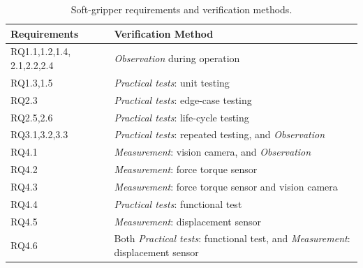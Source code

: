 \documentclass[lettersize,journal]{IEEEtran}
\begin{document}
\begin{table}%
	\centering
	\begin{tabular}{|p{16mm}|p{65mm}|}
		\hline
		\textbf{Requirements} & \textbf{Verification Method} \\ 
		\hline
		RQ1.1,1.2,1.4, 2.1,2.2,2.4 & \emph{Observation} during operation\\%
		\hline
		RQ1.3,1.5 & \emph{Practical tests}: unit testing  \\
		\hline
		RQ2.3 & \emph{Practical tests}: edge-case testing \\
		\hline
		RQ2.5,2.6 & \emph{Practical tests}: life-cycle testing \\
		\hline
		RQ3.1,3.2,3.3 & \emph{Practical tests}: repeated testing, and \emph{Observation} \\
		\hline
		RQ4.1 & \emph{Measurement}: vision camera, and \emph{Observation}  \\ 
		\hline
		RQ4.2 & \emph{Measurement}: force torque sensor \\ 
		\hline
		RQ4.3 & \emph{Measurement}: force torque sensor and vision camera  \\ 
		\hline
		RQ4.4 & \emph{Practical tests}: functional test\\ 
		\hline
		RQ4.5 & \emph{Measurement}: displacement sensor   \\ 
		\hline
		RQ4.6 & Both \emph{Practical tests}: functional test, and \emph{Measurement}: displacement sensor \\ 
		\hline
	\end{tabular}
	\caption{\label{Table:Verifiability} Soft-gripper requirements and verification methods.}
\end{table}
\end{document}

